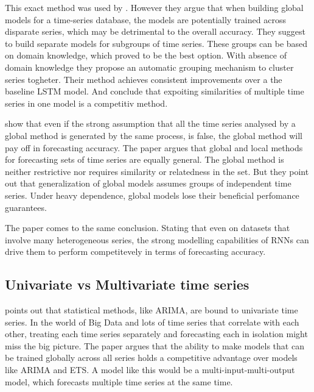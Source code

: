 This exact method was used by \cite{Bandara2017}. However they argue that 
when building global models for a time-series database, the models are
potentially trained across disparate series, which may be detrimental to the overall accuracy.
They suggest to build separate models for subgroups of time series.
These groups can be based on domain knowledge, which proved to be the best option. With absence of 
domain knowledge they propose an automatic grouping mechanism to cluster series togheter.
Their method achieves consistent improvements over a the baseline LSTM model.
And conclude that expoiting similarities of multiple time series in one model is a competitiv method.




\cite{Rabanser2020} show that even if the strong assumption that all the time series analysed by a global
method is generated by the same process, is false, the global method will pay off in forecasting accuracy.
The paper argues that global and local methods for forecasting
sets of time series are equally general. The global method is neither restrictive nor requires
similarity or relatedness in the set.
But they point out that generalization of global models assumes groups of independent time series.
Under heavy dependence, global models lose their beneficial perfomance guarantees. 

The paper \cite{Hewamalage2021} comes to the same conclusion. Stating that 
even on datasets that involve many heterogeneous series, the strong modelling capabilities of RNNs can drive
them to perform competitevely in terms of forecasting accuracy.

\subsection{Univariate vs Multivariate time series}
\cite{Bandara2017} points out that statistical methods, like ARIMA, are bound to
univariate time series. In the world of Big Data and lots of time series that correlate with each other,
treating each time series separately and forecasting each in isolation might miss the big picture.
The paper argues that the ability to make models that can be trained globally across all series
holds a competitive advantage over models like ARIMA and ETS.
A model like this would be a multi-input-multi-output model, which forecasts multiple time series
at the same time.

